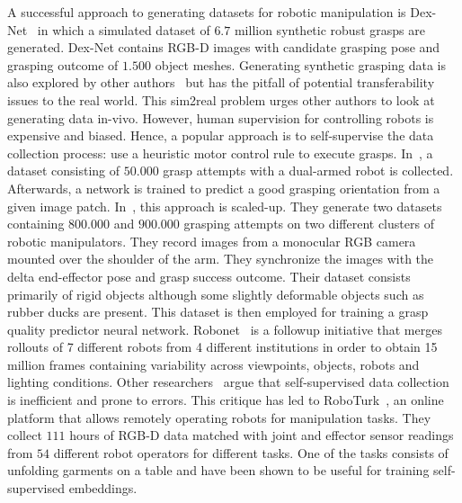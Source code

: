 \documentclass[\home/main.tex]{subfiles}
\begin{document}
A successful approach to generating datasets for robotic manipulation is Dex-Net~\autocite{dexnet2} in which a simulated dataset of $6.7$ million synthetic robust grasps are generated. Dex-Net contains RGB-D images with candidate grasping pose and grasping outcome of $1.500$ object meshes. Generating synthetic grasping data is also explored by other authors~\autocite{depierre2018jacquard,redmon2015real} but has the pitfall of potential transferability issues to the real world. This sim2real problem urges other authors to look at generating data in-vivo. However, human supervision for controlling robots is expensive and biased. Hence, a popular approach is to self-supervise the data collection process: use a heuristic motor control rule to execute grasps. In~\autocite{pinto2016supersizing}, a dataset consisting of $50.000$ grasp attempts with a dual-armed robot is collected. Afterwards, a network is trained to predict a good grasping orientation from a given image patch.
In~\autocite{Levine2016}, this approach is scaled-up. They generate two datasets containing $800.000$ and $900.000$ grasping attempts on two different clusters of robotic manipulators. They record images from a monocular RGB camera mounted over the shoulder of the arm. They synchronize the images with the delta end-effector pose and grasp success outcome. Their dataset consists primarily of rigid objects although some slightly deformable objects such as rubber ducks are present. This dataset is then employed for training a grasp quality predictor neural network.
Robonet~\autocite{dasari2019robonet} is a followup initiative that merges rollouts of 7 different robots from 4 different institutions in order to obtain 15 million frames containing variability across viewpoints, objects, robots and lighting conditions.
Other researchers~\autocite{mandlekar2018roboturk} argue that self-supervised data collection is inefficient and prone to errors. This critique has led to RoboTurk~\autocite{mandlekar2018roboturk}, an online platform that allows remotely operating robots for manipulation tasks. They collect $111$ hours of RGB-D data matched with joint and effector sensor readings from $54$ different robot operators for different tasks. One of the tasks consists of unfolding garments on a table and have been shown to be useful for training self-supervised embeddings.
\end{document}
